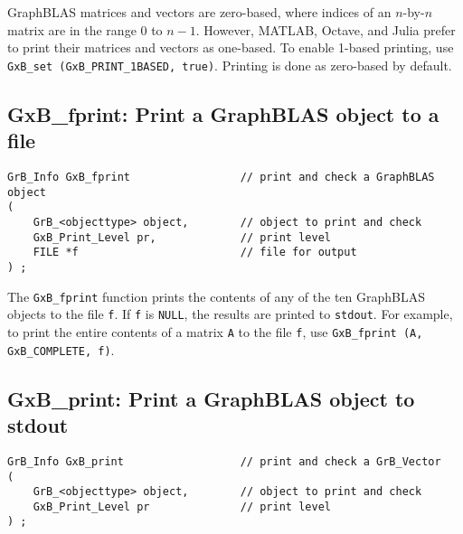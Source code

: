 \documentclass[12pt]{article}
\begin{document}
GraphBLAS matrices and vectors are zero-based, where indices of an $n$-by-$n$
matrix are in the range 0 to $n-1$.  However, MATLAB, Octave, and Julia prefer
to print their matrices and vectors as one-based.  To enable 1-based printing,
use \verb'GxB_set (GxB_PRINT_1BASED, true)'.  Printing is done as zero-based by
default.

\newpage
\subsection{{\sf GxB\_fprint:} Print a GraphBLAS object to a file} %

\begin{mdframed}[userdefinedwidth=6in]
{\footnotesize
\begin{verbatim}
GrB_Info GxB_fprint                 // print and check a GraphBLAS object
(
    GrB_<objecttype> object,        // object to print and check
    GxB_Print_Level pr,             // print level
    FILE *f                         // file for output
) ;
\end{verbatim} } \end{mdframed}

The \verb'GxB_fprint' function prints the contents of any of the ten GraphBLAS
objects to the file \verb'f'.  If \verb'f' is \verb'NULL', the results are
printed to \verb'stdout'.  For example, to print the entire contents of a
matrix \verb'A' to the file \verb'f', use
\verb'GxB_fprint (A, GxB_COMPLETE, f)'.

\subsection{{\sf GxB\_print:} Print a GraphBLAS object to {\sf stdout}} %
\label{gxb_print}

\begin{mdframed}[userdefinedwidth=6in]
{\footnotesize
\begin{verbatim}
GrB_Info GxB_print                  // print and check a GrB_Vector
(
    GrB_<objecttype> object,        // object to print and check
    GxB_Print_Level pr              // print level
) ;
\end{verbatim} } \end{mdframed}
\end{document}
